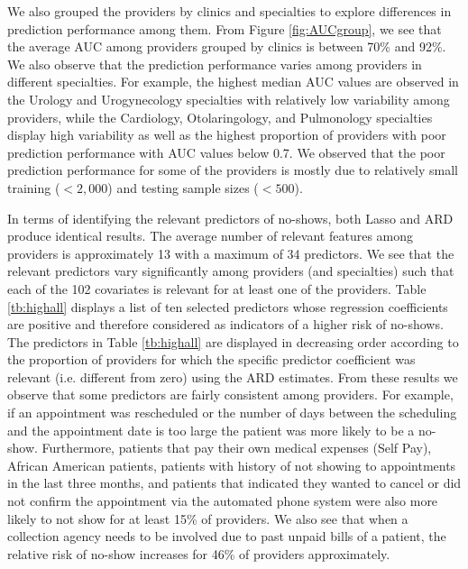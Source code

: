 \documentclass[twoside,11pt]{article}
\begin{document}
We also grouped the providers by clinics and specialties to explore differences in prediction performance among them. From Figure \ref{fig:AUCgroup}, we see that the average AUC among providers grouped by clinics is between 70\% and 92\%. We also observe that the prediction performance varies among providers in different specialties. For example, the highest median AUC values are observed in the Urology and Urogynecology specialties with relatively low variability among providers, while the Cardiology, Otolaringology, and Pulmonology specialties display high variability as well as the highest proportion of providers with poor prediction performance with AUC values below 0.7. We observed that the poor prediction performance for some of the providers is mostly due to relatively small training ($< 2,000$) and testing sample sizes ($< 500$).

In terms of identifying the relevant predictors of no-shows, both Lasso and ARD produce identical results. The average number of relevant features among providers is approximately 13 with a maximum of 34 predictors. We see that the relevant predictors vary significantly among providers (and specialties) such that each of the 102 covariates is relevant for at least one of the providers. Table \ref{tb:highall} displays a list of ten selected predictors whose regression coefficients are positive and therefore considered as indicators of a higher risk of no-shows. The predictors in Table \ref{tb:highall} are displayed in decreasing order according to the proportion of providers for which the specific predictor coefficient was relevant (i.e. different from zero) using the ARD estimates. From these results we observe that some predictors are fairly consistent among providers. For example, if an appointment was rescheduled or the number of days between the scheduling and the appointment date is too large the patient was more likely to be a no-show. Furthermore, patients that pay their own medical expenses (Self Pay), African American patients, patients with history of not showing to appointments in the last three months, and patients that indicated they wanted to cancel or did not confirm the appointment via the automated phone system were also more likely to not show for at least 15\% of providers. We also see that when a collection agency needs to be involved due to past unpaid bills of a patient, the relative risk of no-show increases for 46\% of providers approximately.

\vspace{-0.4cm}
\end{document}
